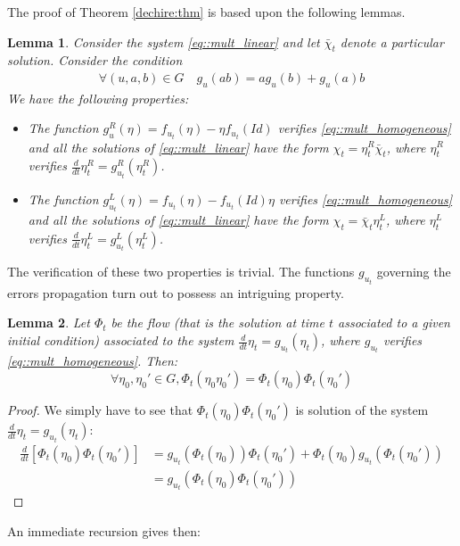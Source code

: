 \documentclass[a4paper,12pt,onecolumn]{article}
\newtheorem{lem}{Lemma}
\begin{document}
The proof of Theorem \ref{dechire:thm} is based upon the following lemmas.
\begin{lem}Consider the system \eqref{eq::mult_linear} and let $\bar{\chi}_t$ denote a particular solution. Consider the condition
\begin{equation}\begin{aligned}
\label{eq::mult_homogeneous}
\forall (u,a,b)\in G\quad
g_u(ab)  =ag_u(b)+g_u(a)b
\end{aligned}
\end{equation}
We have the following properties:
\begin{itemize}
\item The function $g^R_u(\eta)=f_{u_t}(\eta)-\eta f_{u_t}(Id)$  verifies \eqref{eq::mult_homogeneous} and all the solutions of \eqref{eq::mult_linear} have the form $\chi_t=\eta_t^R \bar{\chi}_t$, where $\eta_t^R$ verifies $\frac{d}{dt} \eta_t^R = g_{u_t}^R(\eta_t^R)$.
\item The function $g^L_{u_t}(\eta)=f_{u_t}(\eta)- f_{u_t}(Id)\eta$  verifies  \eqref{eq::mult_homogeneous} and all the solutions of \eqref{eq::mult_linear} have the form $\chi_t= \bar{\chi}_t\eta_t^L$, where $\eta_t^L$ verifies $\frac{d}{dt} \eta_t^L = g_{u_t}^L(\eta_t^L)$.
\end{itemize}
\end{lem}
The verification of these two properties is trivial. The functions $g_{u_t}$ governing the errors propagation turn out to possess an intriguing property. 
\begin{lem}
\label{prop::product}
Let $\Phi_t$ be the flow (that is the solution at time $t$ associated to a given initial condition) associated to the system $\frac{d}{dt}\eta_t=g_{u_t}(\eta_t)$, where $g_{u_t}$ verifies \eqref{eq::mult_homogeneous}. Then:
\[
\forall \eta_0, \eta_0' \in G, \Phi_t(\eta_0 \eta_0')=\Phi_t(\eta_0) \Phi_t(\eta_0')
\]
\end{lem}
\begin{proof}
We simply have to see that $\Phi_t(\eta_0) \Phi_t(\eta_0')$ is solution of the system $\frac{d}{dt}\eta_t=g_{u_t}(\eta_t)$:
\begin{align*}
\frac{d}{dt} [\Phi_t(\eta_0) \Phi_t(\eta_0')]  & = g_{u_t}(\Phi_t(\eta_0)) \Phi_t(\eta_0') + \Phi_t(\eta_0) g_{u_t}(\Phi_t(\eta_0')) \\&= g_{u_t} \left( \Phi_t(\eta_0) \Phi_t(\eta_0') \right)
\end{align*}
\end{proof}
An immediate recursion gives then:
\end{document}
